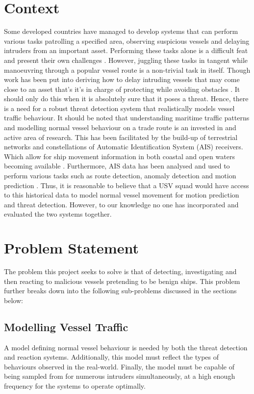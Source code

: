 \documentclass[bsc,frontabs,twoside,singlespacing,parskip,deptreport]{infthesis}     %
\begin{document}
\section{Context}
Some developed countries have managed to develop systems that can perform various tasks patrolling a specified area, observing suspicious vessels and delaying intruders from an important asset. Performing these tasks alone is a difficult feat and present their own challenges \cite{usvcase}\cite{wolf2017caracas}\cite{raboin2013model}. However, juggling these tasks in tangent while manoeuvring through a popular vessel route is a non-trivial task in itself. Though work has been put into deriving how to delay intruding vessels that may come close to an asset that's it's in charge of protecting \cite{raboin2013model} while avoiding obstacles \cite{gupta2015block}\cite{marzoughi2018collision}. It should only do this when it is absolutely sure that it poses a threat. Hence, there is a need for a robust threat detection system that realistically models vessel traffic behaviour. It should be noted that understanding maritime traffic patterns and modelling normal vessel behaviour on a trade route is an invested in and active area of research. This has been facilitated by the build-up of terrestrial networks and constellations of Automatic Identification System (AIS) receivers. Which allow for ship movement information in both coastal and open waters becoming available \cite{perez2009automatic}. Furthermore, AIS data has been analysed and used to perform various tasks such as route detection, anomaly detection and motion prediction\cite{pallotta2013vessel} \cite{ristic2008statistical} \cite{kowalska2012maritime}. Thus, it is reasonable to believe that a USV squad would have access to this historical data to model normal vessel movement for motion prediction and threat detection. However, to our knowledge no one has incorporated and evaluated the two systems together.


\section{Problem Statement}
The problem this project seeks to solve is that of detecting, investigating and then reacting to malicious vessels pretending to be benign ships. This problem further breaks down into the following sub-problems discussed in the sections below:

\subsection{Modelling Vessel Traffic}
A model defining normal vessel behaviour is needed by both the threat detection and reaction systems. Additionally, this model must reflect the types of behaviours observed in the real-world. Finally, the model must be capable of being sampled from for numerous intruders simultaneously, at a high enough frequency for the systems to operate optimally. 
\end{document}
